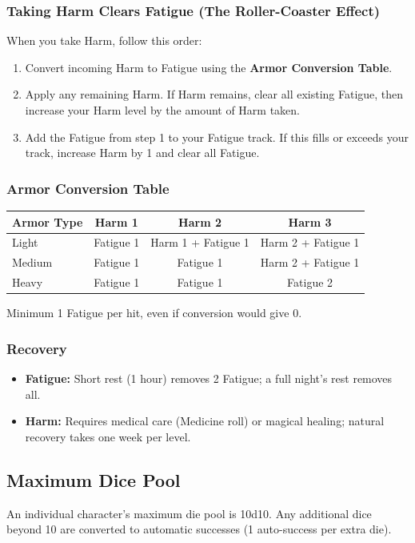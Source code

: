 \subsubsection{Taking Harm Clears Fatigue (The Roller-Coaster Effect)}
When you take Harm, follow this order:
\begin{enumerate}
  \item Convert incoming Harm to Fatigue using the \textbf{Armor Conversion Table}.
  \item Apply any remaining Harm. If Harm remains, clear all existing Fatigue, then increase your Harm level by the amount of Harm taken.
  \item Add the Fatigue from step 1 to your Fatigue track. If this fills or exceeds your track, increase Harm by 1 and clear all Fatigue.
\end{enumerate}

\subsubsection{Armor Conversion Table}

\begin{tabular}{@{}lccc@{}}
\toprule
\textbf{Armor Type} & \textbf{Harm 1} & \textbf{Harm 2} & \textbf{Harm 3} \\
\midrule
Light  & Fatigue 1 & Harm 1 + Fatigue 1 & Harm 2 + Fatigue 1 \\
Medium & Fatigue 1 & Fatigue 1 & Harm 2 + Fatigue 1 \\
Heavy  & Fatigue 1 & Fatigue 1 & Fatigue 2 \\
\bottomrule
\end{tabular}

Minimum 1 Fatigue per hit, even if conversion would give 0.

\subsubsection{Recovery}
\begin{itemize}
  \item \textbf{Fatigue:} Short rest (1 hour) removes 2 Fatigue; a full night's rest removes all.
  \item \textbf{Harm:} Requires medical care (Medicine roll) or magical healing; natural recovery takes one week per level.
\end{itemize}

\subsection{Maximum Dice Pool}
An individual character's maximum die pool is 10d10. Any additional dice beyond 10 are converted to automatic successes (1 auto-success per extra die).

